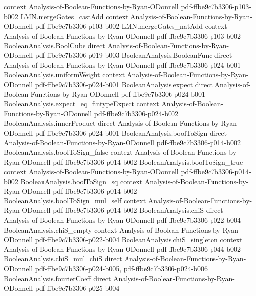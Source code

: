 \begin{lemma}
  {context}
  {Analysis-of-Boolean-Functions-by-Ryan-ODonnell}
  {pdf-ffbe9c7b3306-p103-b002}
\proofstep
  {LMN.mergeGates_castAdd}
  {context}
  {Analysis-of-Boolean-Functions-by-Ryan-ODonnell}
  {pdf-ffbe9c7b3306-p103-b002}
\proofstep
  {LMN.mergeGates_natAdd}
  {context}
  {Analysis-of-Boolean-Functions-by-Ryan-ODonnell}
  {pdf-ffbe9c7b3306-p103-b002}
\proofstep
  {BooleanAnalysis.BoolCube}
  {direct}
  {Analysis-of-Boolean-Functions-by-Ryan-ODonnell}
  {pdf-ffbe9c7b3306-p019-b003}
\proofstep
  {BooleanAnalysis.BooleanFunc}
  {direct}
  {Analysis-of-Boolean-Functions-by-Ryan-ODonnell}
  {pdf-ffbe9c7b3306-p024-b001}
\proofstep
  {BooleanAnalysis.uniformWeight}
  {context}
  {Analysis-of-Boolean-Functions-by-Ryan-ODonnell}
  {pdf-ffbe9c7b3306-p024-b001}
\proofstep
  {BooleanAnalysis.expect}
  {direct}
  {Analysis-of-Boolean-Functions-by-Ryan-ODonnell}
  {pdf-ffbe9c7b3306-p024-b001}
\proofstep
  {BooleanAnalysis.expect_eq_fintypeExpect}
  {context}
  {Analysis-of-Boolean-Functions-by-Ryan-ODonnell}
  {pdf-ffbe9c7b3306-p024-b002}
\proofstep
  {BooleanAnalysis.innerProduct}
  {direct}
  {Analysis-of-Boolean-Functions-by-Ryan-ODonnell}
  {pdf-ffbe9c7b3306-p024-b001}
\proofstep
  {BooleanAnalysis.boolToSign}
  {direct}
  {Analysis-of-Boolean-Functions-by-Ryan-ODonnell}
  {pdf-ffbe9c7b3306-p014-b002}
\proofstep
  {BooleanAnalysis.boolToSign_false}
  {context}
  {Analysis-of-Boolean-Functions-by-Ryan-ODonnell}
  {pdf-ffbe9c7b3306-p014-b002}
\proofstep
  {BooleanAnalysis.boolToSign_true}
  {context}
  {Analysis-of-Boolean-Functions-by-Ryan-ODonnell}
  {pdf-ffbe9c7b3306-p014-b002}
\proofstep
  {BooleanAnalysis.boolToSign_sq}
  {context}
  {Analysis-of-Boolean-Functions-by-Ryan-ODonnell}
  {pdf-ffbe9c7b3306-p014-b002}
\proofstep
  {BooleanAnalysis.boolToSign_mul_self}
  {context}
  {Analysis-of-Boolean-Functions-by-Ryan-ODonnell}
  {pdf-ffbe9c7b3306-p014-b002}
\proofstep
  {BooleanAnalysis.chiS}
  {direct}
  {Analysis-of-Boolean-Functions-by-Ryan-ODonnell}
  {pdf-ffbe9c7b3306-p022-b004}
\proofstep
  {BooleanAnalysis.chiS_empty}
  {context}
  {Analysis-of-Boolean-Functions-by-Ryan-ODonnell}
  {pdf-ffbe9c7b3306-p022-b004}
\proofstep
  {BooleanAnalysis.chiS_singleton}
  {context}
  {Analysis-of-Boolean-Functions-by-Ryan-ODonnell}
  {pdf-ffbe9c7b3306-p044-b002}
\proofstep
  {BooleanAnalysis.chiS_mul_chiS}
  {direct}
  {Analysis-of-Boolean-Functions-by-Ryan-ODonnell}
  {pdf-ffbe9c7b3306-p024-b005,
    pdf-ffbe9c7b3306-p024-b006}
\proofstep
  {BooleanAnalysis.fourierCoeff}
  {direct}
  {Analysis-of-Boolean-Functions-by-Ryan-ODonnell}
  {pdf-ffbe9c7b3306-p025-b004}
\proofstep

\end{lemma}
